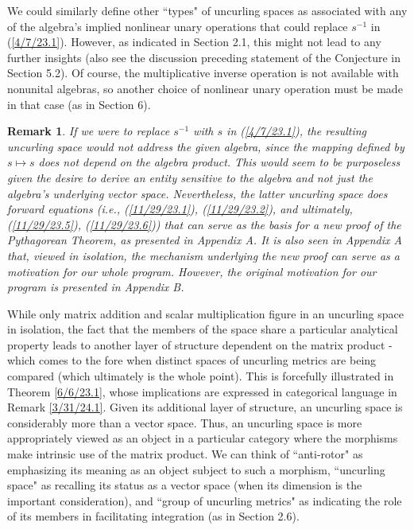 \documentclass{amsart}
\numberwithin{equation}{section}
\newtheorem{remark}[theorem]{Remark}
\theoremstyle{definition}
\numberwithin{theorem}{section}
\begin{document}
 We could similarly define other ``types" of uncurling spaces as associated with any of the algebra's implied nonlinear unary operations that could replace $s^{-1}$ in (\ref{4/7/23.1}). However, as indicated in Section 2.1, this might not lead to any further insights (also see the discussion preceding statement of the Conjecture in Section 5.2).  Of course, the multiplicative inverse operation is not available with nonunital algebras, so another choice of nonlinear unary operation must be made in that case (as in Section 6).    
 
 
\begin{remark}\label{11/21/23.1} {\rm If we were to replace $s^{-1}$ with $s$ in (\ref{4/7/23.1}), the resulting uncurling space would not address the given algebra, since the mapping defined by $s\mapsto s$ does not depend on the algebra product.  This would seem to be purposeless given the desire to derive an entity sensitive to the algebra and not just the algebra's underlying vector space.  Nevertheless, the latter uncurling space does forward equations (i.e., (\ref{11/29/23.1}), (\ref{11/29/23.2}), and ultimately, (\ref{11/29/23.5}), (\ref{11/29/23.6})) that can serve as the basis for a new proof of the Pythagorean Theorem, as presented in Appendix A.  It is also seen in Appendix A that, viewed in isolation, the mechanism underlying the new proof can serve as a motivation for our whole program.  However, the original motivation for our program is presented in Appendix B.  }\end{remark}
 
While only matrix addition and scalar multiplication figure in an uncurling space in isolation, the fact that the members of the space share a particular analytical property leads to another layer of structure dependent on the matrix product - which comes to the fore when distinct spaces of uncurling metrics are being compared (which ultimately is the whole point).  This is forcefully illustrated in Theorem \ref{6/6/23.1}, whose implications are expressed in categorical language in Remark \ref{3/31/24.1}. Given its additional layer of structure, an uncurling space is considerably more than a vector space.  Thus, an uncurling space is more appropriately viewed as an object in a particular category where the morphisms make intrinsic use of the matrix product.    
We can think of  ``anti-rotor" as emphasizing its meaning as an object subject to such a morphism, ``uncurling space" as recalling its status as a vector space (when its dimension is the important consideration), and ``group of uncurling metrics" as indicating the role of its members in facilitating integration (as in Section 2.6).
 
\end{document}
